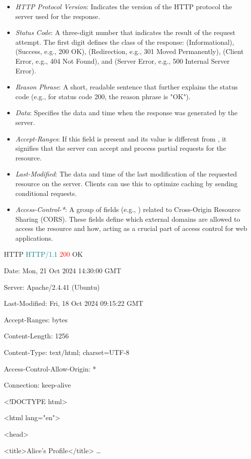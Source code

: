 \begin{itemize}
    \item \textit{HTTP Protocol Version}: Indicates the version of the HTTP protocol the server used for the response.
    \item \textit{Status Code}: A three-digit number that indicates the result of the request attempt. The first digit defines the class of the response:  (Informational),  (Success, e.g., 200 OK),  (Redirection, e.g., 301 Moved Permanently),  (Client Error, e.g., 404 Not Found), and  (Server Error, e.g., 500 Internal Server Error).
    \item \textit{Reason Phrase}: A short, readable sentence that further explains the status code (e.g., for status code 200, the reason phrase is "OK").
    \item \textit{Data}: Specifies the data and time when the response was generated by the server.
    \item \textit{Accept-Ranges}: If this field is present and its value is different from , it signifies that the server can accept and process partial requests for the resource.
    \item \textit{Last-Modified}: The data and time of the last modification of the requested resource on the server. Clients can use this to optimize caching by sending conditional requests.
    \item \textit{Access-Control-*}: A group of fields (e.g., ) related to Cross-Origin Resource Sharing (CORS). These fields define which external domains are allowed to access the resource and how, acting as a crucial part of access control for web applications.
\end{itemize}

\begin{customcode}{HTTP}
    \textcolor{teal}{HTTP/1.1} \textcolor{red}{200} \textcolor{OliveGreen}{OK}

    \textcolor{RedOrange}{Date}: Mon, 21 Oct 2024 14:30:00 GMT

    \textcolor{RedOrange}{Server}: Apache/2.4.41 (Ubuntu)

    \textcolor{RedOrange}{Last-Modified}: Fri, 18 Oct 2024 09:15:22 GMT

    \textcolor{RedOrange}{Accept-Ranges}: bytes

    \textcolor{RedOrange}{Content-Length}: 1256

    \textcolor{RedOrange}{Content-Type}: text/html; charset=UTF-8

    \textcolor{RedOrange}{Access-Control-Allow-Origin}: *

    \textcolor{RedOrange}{Connection}: keep-alive

    \vspace{2\baselineskip}

    <!DOCTYPE html>

    <html lang="en">

    <head>

    <title>Alice's Profile</title> \ldots
\end{customcode}

